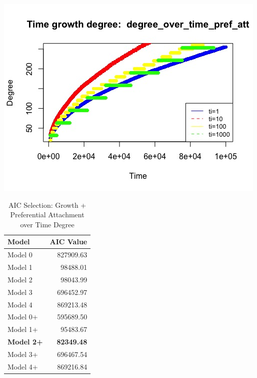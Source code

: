 \documentclass[12pt, a4paper]{article}
\begin{document}
\begin{minipage}[t]{\linewidth}
    \includegraphics[width=\textwidth]{time_growth_degree_pref_att}
    \captionsetup{type=figure}
    \label{fig:time_growth_degree_pref_att}
  \end{minipage}

\begin{table}[H]
    \centering
    \begin{tabular}{l r}
        Model & AIC Value\\
        \hline
        Model 0  &  827909.63\\
        Model 1  &  98488.01\\
        Model 2  &  98043.99\\
        Model 3  &  696452.97\\
        Model 4  &  869213.48\\
        Model 0+  &  595689.50\\
        Model 1+  &  95483.67\\
        \textbf{Model 2+} & \textbf{82349.48}\\
        Model 3+  &  696467.54\\
        Model 4+  &  869216.84\\
    \end{tabular}
    \caption{AIC Selection: Growth + Preferential Attachment over Time Degree}
    \label{table:time_grow_ran_att_1}
\end{table}
\end{document}
